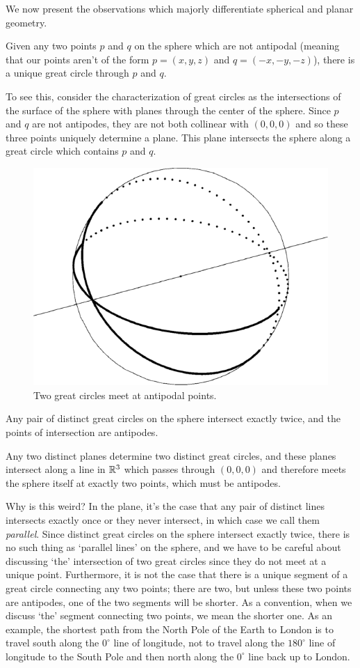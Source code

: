 We now present the observations which majorly differentiate spherical and planar geometry.

\begin{claim}
	Given any two points $p$ and $q$ on the sphere which are not antipodal (meaning that our points aren't of the form $p=(x,y,z)$ and $q=(-x,-y,-z)$), there is a unique great circle through $p$ and $q$. 
\end{claim}

To see this, consider the characterization of great circles as the intersections of the surface of the sphere with planes through the center of the sphere.  Since $p$ and $q$ are not antipodes, they are not both collinear with $(0,0,0)$ and so these three points uniquely determine a plane.  This plane intersects the sphere along a great circle which contains $p$ and $q$.

\begin{figure}[htb]
	\centering
	\includegraphics[width=.35\textwidth]{figs/2gc.pdf}
	\caption{Two great circles meet at antipodal points.}
	\label{fig:2gc}
\end{figure}


\begin{claim}
	Any pair of distinct great circles on the sphere intersect exactly twice, and the points of intersection are antipodes.
\end{claim}

Any two distinct planes determine two distinct great circles, and these planes intersect along a line in $\mathbb{R}^3$ which passes through $(0,0,0)$ and therefore meets the sphere itself at exactly two points, which must be antipodes.

Why is this weird? In the plane, it's the case that any pair of distinct lines intersects exactly once or they never intersect, in which case we call them \textit{parallel}. Since distinct great circles on the sphere intersect exactly twice, there is no such thing as `parallel lines' on the sphere, and we have to be careful about discussing `the' intersection of two great circles since they do not meet at a unique point.  Furthermore, it is not the case that there is a unique segment of a great circle connecting any two points; there are two, but unless these two points are antipodes, one of the two segments will be shorter.  As a convention, when we discuss `the' segment connecting two points, we mean the shorter one.  As an example, the shortest path from the North Pole of the Earth to London is to travel south along the $0^\circ$ line of longitude, not to travel along the $180^\circ$ line of longitude to the South Pole and then north along the $0^\circ$ line back up to London.

